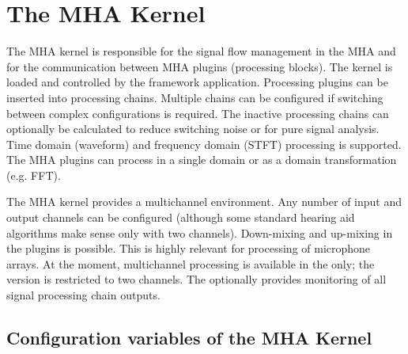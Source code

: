 \section{The MHA Kernel}
\label{sec:kernel}

The MHA kernel is responsible for the signal flow management in the MHA and
for the communication between MHA plugins (processing blocks). The kernel is
loaded and controlled by the framework application. Processing plugins can be
inserted into processing chains. Multiple chains can be configured if
switching between complex configurations is required. The inactive processing
chains can optionally be calculated to reduce switching noise or for pure
signal analysis. Time domain (waveform) and frequency domain (STFT) processing
is supported. The MHA plugins can process in a single domain or as a domain
transformation (e.g. FFT).

The MHA kernel provides a multichannel environment. Any number of input and
output channels can be configured (although some standard hearing aid
algorithms make sense only with two channels).
%
Down-mixing and up-mixing in the plugins is possible.
%
This is highly relevant for processing of microphone arrays.
%
At the moment, multichannel processing is available in the \mhad{}
only; the \Windows{} version is restricted to two channels.
%
The \mhad{} optionally provides monitoring of all signal processing
chain outputs.

\subsection{Configuration variables of the MHA Kernel}


